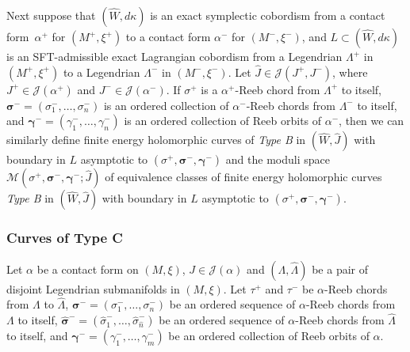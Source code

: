 \documentclass[10pt]{amsart}
\let\mathcal\mathscr
\theoremstyle{plain}
\theoremstyle{definition}
\numberwithin{equation}{subsection}
\let\bs\boldsymbol
\begin{document}
Next suppose that $(\widehat W,d\kappa)$ is an exact symplectic cobordism from a contact form~$\alpha^+$ for $(M^+,\xi^+)$ to a contact form $\alpha^-$ for $(M^-,\xi^-)$, and $L \subset (\widehat W,d\kappa)$ is an SFT-admissible exact Lagrangian cobordism from a Legendrian $\Lambda^+$ in $(M^+,\xi^+)$ to a Legendrian $\Lambda^-$ in $(M^-,\xi^-)$. Let $\widehat{J}\in \mathcal{J}(J^+,J^-)$, where $J^+ \in \mathcal{J}(\alpha^+)$ and $J^- \in \mathcal{J}(\alpha^-)$. If $\sigma^+$ is a $\alpha^+$-Reeb chord from $\Lambda^+$ to itself, $\bs\sigma^-=(\sigma^-_1,\dots,\sigma^-_n)$ is an ordered collection of $\alpha^-$-Reeb chords from $\Lambda^-$ to itself, and $\bs\gamma^-=(\gamma^-_1,\dots,\gamma^-_n)$ is an ordered collection of Reeb orbits of $\alpha^-$, then we can similarly define finite energy holomorphic curves of \emph{Type B} in $(\widehat W, \widehat{J})$ with boundary in $L$ asymptotic to $(\sigma^+,\bs\sigma^-,\bs\gamma^-)$ and the moduli space ${\mathcal{M}}(\sigma^+,\bs\sigma^-,\bs\gamma^-;\widehat{J})$ of equivalence classes of finite energy holomorphic curves \emph{Type B} in $(\widehat W, \widehat{J})$ with boundary in $L$ asymptotic to $(\sigma^+,\bs\sigma^-,\bs\gamma^-)$.

\subsubsection{Curves of {Type C}} \label{subsubsection: C}

Let $\alpha$ be a contact form on $(M,\xi)$, $J\in \mathcal{J}(\alpha)$ and $(\Lambda,\widehat{\Lambda})$ be a pair of disjoint Legendrian submanifolds in $(M,\xi)$. Let $\tau^+$ and $\tau^-$ be $\alpha$-Reeb chords from $\Lambda$ to $\widehat{\Lambda}$, $\bs\sigma^-=(\sigma^-_1,\dots,\sigma^-_n)$ be an ordered sequence of $\alpha$-Reeb chords from $\Lambda$ to itself, $\widehat{\bs\sigma}^-=(\widehat{\sigma}^-_1,\dots,\widehat{\sigma}^-_{\widehat{n}})$ be an ordered sequence of $\alpha$-Reeb chords from $\widehat{\Lambda}$ to itself, and $\bs\gamma^-=(\gamma^-_1,\dots,\gamma^-_m)$ be an ordered collection of Reeb orbits of $\alpha$.
\end{document}
